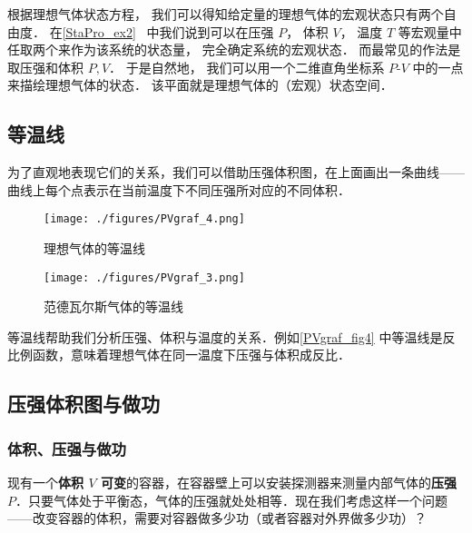 
\begin{issues}
\issueDraft
\end{issues}


根据理想气体状态方程， 我们可以得知给定量的理想气体的宏观状态只有两个自由度． 在\autoref{StaPro_ex2}~ 中我们说到可以在压强 $P$， 体积 $V$， 温度 $T$ 等宏观量中任取两个来作为该系统的状态量， 完全确定系统的宏观状态． 而最常见的作法是取压强和体积 $P,V$． 于是自然地， 我们可以用一个二维直角坐标系 $P$-$V$ 中的一点来描绘理想气体的状态． 该平面就是理想气体的（宏观）状态空间．


\subsection{等温线}
为了直观地表现它们的关系，我们可以借助压强体积图，在上面画出一条曲线——曲线上每个点表示在当前温度下不同压强所对应的不同体积．
\begin{figure}[ht]
\centering
\texttt{[image: ./figures/PVgraf\_4.png]}
\caption{理想气体的等温线} \label{PVgraf_fig4}
\end{figure}
\begin{figure}[ht]
\centering
\texttt{[image: ./figures/PVgraf\_3.png]}
\caption{范德瓦尔斯气体的等温线} \label{PVgraf_fig3}
\end{figure}

等温线帮助我们分析压强、体积与温度的关系．例如\autoref{PVgraf_fig4} 中等温线是反比例函数，意味着理想气体在同一温度下压强与体积成反比．

\subsection{压强体积图与做功}

\subsubsection{体积、压强与做功}
现有一个\textbf{体积 $V$ 可变}的容器，在容器壁上可以安装探测器来测量内部气体的\textbf{压强 $P$}．只要气体处于平衡态，气体的压强就处处相等．现在我们考虑这样一个问题——改变容器的体积，需要对容器做多少功（或者容器对外界做多少功）？

